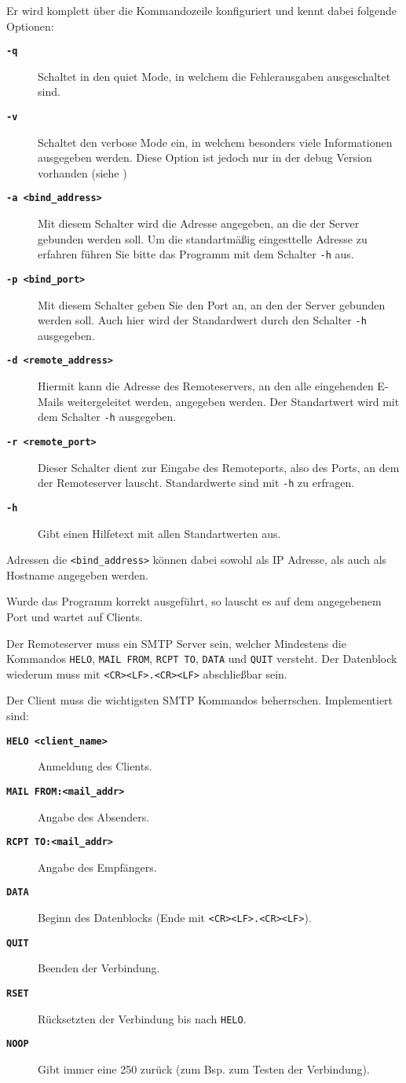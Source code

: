 Er wird komplett \"{u}ber die Kommandozeile konfiguriert und kennt dabei folgende Optionen:
\begin{description}
  \item[\texttt\bf{-q}] Schaltet in den quiet Mode, in welchem die Fehlerausgaben ausgeschaltet sind.
  \item[\texttt\bf{-v}] Schaltet den verbose Mode ein, in welchem besonders viele Informationen ausgegeben werden. Diese Option ist jedoch nur in der debug Version vorhanden (siehe )
  \item[\texttt\bf{-a <bind\_address>}] Mit diesem Schalter wird die Adresse angegeben, an die der Server gebunden werden soll. Um die standartm\"{a}ßig eingesttelle Adresse zu erfahren f\"{u}hren Sie bitte das Programm mit dem Schalter \texttt{-h} aus. 
  \item[\texttt\bf{-p <bind\_port>}] Mit diesem Schalter geben Sie den Port an, an den der Server gebunden werden soll. Auch hier wird der Standardwert durch den Schalter \texttt{-h} ausgegeben.
  \item[\texttt\bf{-d <remote\_address>}] Hiermit kann die Adresse des Remoteservers, an den alle eingehenden E-Mails weitergeleitet werden, angegeben werden. Der Standartwert wird mit dem Schalter \texttt{-h} ausgegeben.
  \item[\texttt\bf{-r <remote\_port>}] Dieser Schalter dient zur Eingabe des Remoteports, also des Ports, an dem der Remoteserver lauscht. Standardwerte sind mit \texttt{-h} zu erfragen.
  \item[\texttt\bf{-h}] Gibt einen Hilfetext mit allen Standartwerten aus. 
\end{description}
Adressen die \texttt{<bind\_address>} k\"{o}nnen dabei sowohl als IP Adresse, als auch als Hostname angegeben werden.

Wurde das Programm korrekt ausgef\"{u}hrt, so lauscht es auf dem angegebenem Port und wartet auf Clients.

Der Remoteserver muss ein SMTP Server sein, welcher Mindestens die Kommandos \texttt{HELO}, \texttt{MAIL FROM}, \texttt{RCPT TO}, \texttt{DATA} und \texttt{QUIT} versteht. Der Datenblock wiederum muss mit \texttt{<CR><LF>.<CR><LF>} abschließbar sein.

Der Client muss die wichtigsten SMTP Kommandos beherrschen. Implementiert sind:
\begin{description}
  \item[\texttt\bf{HELO <client\_name>}] Anmeldung des Clients.
  \item[\texttt\bf{MAIL FROM:<mail\_addr>}] Angabe des Absenders.
  \item[\texttt\bf{RCPT TO:<mail\_addr>}] Angabe des Empf\"{a}ngers.
  \item[\texttt\bf{DATA}] Beginn des Datenblocks (Ende mit \texttt{<CR><LF>.<CR><LF>}).
  \item[\texttt\bf{QUIT}] Beenden der Verbindung.
  \item[\texttt\bf{RSET}] R\"{u}cksetzten der Verbindung bis nach \texttt{HELO}. 
  \item[\texttt\bf{NOOP}] Gibt immer eine 250 zur\"{u}ck (zum Bsp. zum Testen der Verbindung).
\end{description}

